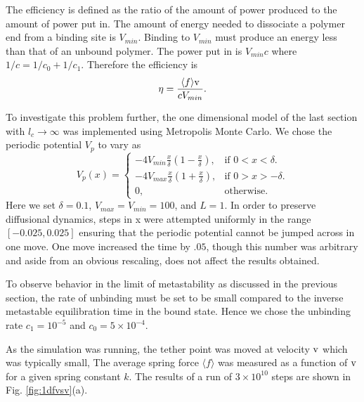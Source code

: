 \documentclass[journal = mamobx, manuscript = article]{achemso}
\begin{document}
The efficiency is defined as the ratio of the amount of power produced to the
amount of power put in. The amount of energy needed to dissociate a polymer end
from a binding site is $V_{min}$. Binding to $V_{min}$ must produce an energy less
than that of an unbound polymer. The power put in is $V_{min} c$ where $1/c =
1/c_0 + 1/c_1$. Therefore the efficiency is
\begin{equation}
\label{eq:efficiency}
\eta = \frac{\langle f\rangle {\rm v}}{c V_{min}} .
\end{equation}

To investigate this problem further, the one dimensional model of the last
section with $l_c\rightarrow \infty$ was implemented using Metropolis Monte Carlo.
We chose the periodic potential $V_p$ to vary as
\begin{equation}
\label{eq:Vp1dsim}
V_p(x)  =\begin{cases}
-4 V_{min} \frac{x}{\delta}(1-\frac{x}{\delta}),  & \text{if $0 < x< \delta$}.\\
-4 V_{max} \frac{x}{\delta}(1+\frac{x}{\delta}),  & \text{if $0 > x> -\delta$}.\\
0, & \text{otherwise}.
\end{cases}
\end{equation}
Here we set $\delta = 0.1$, $V_{max} = V_{min} = 100$, and $L=1$. 
In order to preserve diffusional dynamics, steps in x were attempted uniformly 
in the range $[-0.025,0.025]$ ensuring that the periodic potential cannot
be jumped across in one move. One move increased the time by $.05$, though this
number was arbitrary and aside from an obvious rescaling, does not affect the results obtained.

To observe behavior in the limit of metastability as discussed in the previous
section, the rate of unbinding must be set to be small compared to the inverse
metastable equilibration time in the bound state. Hence we chose the unbinding
rate $c_1 = 10^{-5}$ and $c_0 = 5\times 10^{-4}$. 

As the simulation was running, the tether point was moved at velocity $\rm v$
which was typically small, 
The average spring force $\langle f\rangle$ was measured as a function of $\rm v$
for a given spring constant $k$. The results of a run of $3\times 10^{10}$ steps
are shown in Fig. \ref{fig:1dfvsv}(a).
\end{document}
